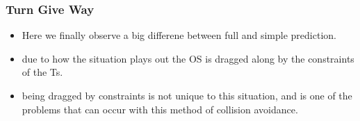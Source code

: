 \subsubsection{Turn Give Way}
\begin{itemize}
    \item Here we finally observe a big differene between full and simple prediction.
    \item due to how the situation plays out the \gls{OS} is dragged along by the constraints of the \gls{Ts}.
    \item being dragged by constraints is not unique to this situation, and is one of the problems that can occur
    with this method of collision avoidance.
\end{itemize}
\clearpage

